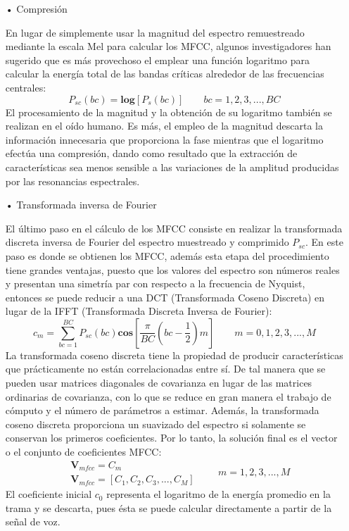 \begin{enumerate}
\begin{enumerate}
\item[•]Compresión
\par
En lugar de simplemente usar la magnitud del espectro remuestreado mediante la escala Mel para calcular los MFCC, algunos investigadores han sugerido que es más provechoso el emplear una función logaritmo para calcular la energía total de las bandas críticas alrededor de las frecuencias centrales:
\begin{equation}
\label{eq:ecuacion63}
P_{sc}(bc) = \mathbf{log}[P_{s}(bc)]
\qquad
bc = 1,2,3,...,BC
\end{equation}
El procesamiento de la magnitud y la obtención de su logaritmo también se realizan en el oído humano. Es más, el empleo de la magnitud descarta la información innecesaria que proporciona la fase mientras que el logaritmo efectúa una compresión, dando como resultado que la extracción de características sea menos sensible a las variaciones de la amplitud producidas por las resonancias espectrales.

\item[•]Transformada inversa de Fourier
\par
El último paso en el cálculo de los MFCC consiste en realizar la transformada discreta inversa de Fourier del espectro muestreado y comprimido $P_{sc}$. En este paso es donde se obtienen los MFCC, además esta etapa del procedimiento tiene grandes ventajas, puesto que los valores del espectro son números reales y presentan una simetría par con respecto a la frecuencia de Nyquist, entonces se puede reducir a una DCT (Transformada Coseno Discreta) en lugar de la IFFT (Transformada Discreta Inversa de Fourier):
\begin{equation}
\label{eq:ecuacion64}
c_{m} = \sum_{bc = 1}^{BC}P_{sc}(bc)\mathbf{cos}\left [ \frac{\pi }{BC}\left ( bc - \frac{1}{2} \right ) m \right ]
\qquad
m = 0,1,2,3,...,M
\end{equation}
La transformada coseno discreta tiene la propiedad de producir características que prácticamente no están correlacionadas entre sí. De tal manera que se pueden usar matrices diagonales de covarianza en lugar de las matrices ordinarias de covarianza, con lo que se reduce en gran manera el trabajo de cómputo y el número de parámetros a estimar. Además, la transformada coseno discreta proporciona un suavizado del espectro si solamente se conservan los primeros coeficientes.
\vskip 0.5cm
Por lo tanto, la solución final es el vector o el conjunto de coeficientes MFCC:
\begin{equation}
\label{eq:ecuacion65}
\begin{aligned}
& \mathbf{V}_{mfcc} = C_{m} \\
& \mathbf{V}_{mfcc} = [C_{1},C_{2},C_{3},...,C_{M}]
\end{aligned}
\qquad
m = 1,2,3,...,M
\end{equation}
El coeficiente inicial $c_{0}$ representa el logaritmo de la energía promedio en la trama y se descarta, pues ésta se puede calcular directamente a partir de la señal de voz.


\end{enumerate}
\end{enumerate}
